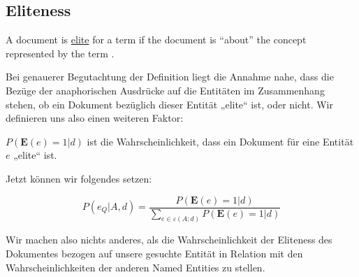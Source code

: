 \subsection{Eliteness}

\begin{defi}
	A document is \underline{elite} for a term if the document is ``about'' the concept represented by the term \cite{paper:Robertson}.
\end{defi}


Bei genauerer Begutachtung der Definition liegt die Annahme nahe, dass die Bezüge der anaphorischen Ausdrücke auf die Entitäten im Zusammenhang stehen, ob ein Dokument bezüglich dieser Entität „elite“ ist, oder nicht. Wir definieren uns also einen weiteren Faktor:

\begin{defi}
$P(\textbf{E}(e) = 1 | d)$ ist die Wahrscheinlichkeit, dass ein Dokument für eine Entität $e$ „elite“ ist.
\end{defi}

Jetzt können wir folgendes setzen:

\[ P(e_Q | A,d) = \frac{P(\textbf{E}(e) = 1 | d)}{\sum_{e \in \varepsilon (A;d)} P(\textbf{E}(e) = 1 | d)} \]

Wir machen also nichts anderes, als die Wahrscheinlichkeit der Eliteness des Dokumentes bezogen auf unsere gesuchte Entität in Relation mit den Wahrscheinlichkeiten der anderen Named Entities zu stellen.
